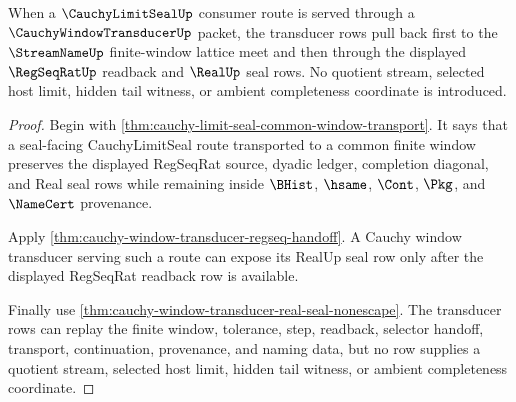 \begin{theorem}
\label{thm:cauchy-limit-seal-cauchy-window-transducer-pullback}
When a $\CauchyLimitSealUp$ consumer route is served through a $\CauchyWindowTransducerUp$ packet, the transducer rows pull back first to the $\StreamNameUp$ finite-window lattice meet and then through the displayed $\RegSeqRatUp$ readback and $\RealUp$ seal rows. No quotient stream, selected host limit, hidden tail witness, or ambient completeness coordinate is introduced.
\end{theorem}
\begin{proof}
Begin with \autoref{thm:cauchy-limit-seal-common-window-transport}. It says that a seal-facing CauchyLimitSeal route transported to a common finite window preserves the displayed RegSeqRat source, dyadic ledger, completion diagonal, and Real seal rows while remaining inside $\BHist$, $\hsame$, $\Cont$, $\Pkg$, and $\NameCert$ provenance.

Apply \autoref{thm:cauchy-window-transducer-regseq-handoff}. A Cauchy window transducer serving such a route can expose its RealUp seal row only after the displayed RegSeqRat readback row is available.

Finally use \autoref{thm:cauchy-window-transducer-real-seal-nonescape}. The transducer rows can replay the finite window, tolerance, step, readback, selector handoff, transport, continuation, provenance, and naming data, but no row supplies a quotient stream, selected host limit, hidden tail witness, or ambient completeness coordinate.
\end{proof}

